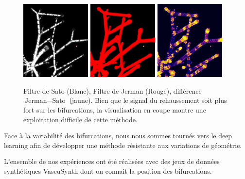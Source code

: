 \begin{figure}[ht]
    \centering
    \includegraphics[height=4cm]{Images/SatoFilter_bif.png}
    \includegraphics[height=4cm]{Images/JermanFilter_bif.png}
    \includegraphics[height=4cm]{Images/subJermanSato_bif.png}
    \caption{Filtre de Sato (Blanc), Filtre de Jerman (Rouge), différence $\textrm{Jerman}-\textrm{Sato}$ (jaune). Bien que le signal du rehaussement soit plus fort sur les bifurcations, la visualisation en coupe montre une exploitation difficile de cette méthode.}
    \label{fig:subtract_vesselness}
\end{figure}

Face à la variabilité des bifurcations, nous nous sommes tournés vers le deep learning afin de développer une méthode résistante aux variations de géométrie.

L'ensemble de nos expériences ont été réalisées avec des jeux de données synthétiques VascuSynth dont on connait la position des bifurcations.

